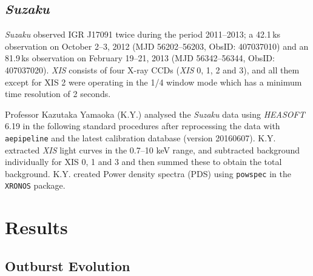 \subsection{\textit{Suzaku}}

\par \textit{Suzaku} observed IGR J17091 twice during the period 2011--2013; a 42.1\,ks observation on October 2--3, 2012 (MJD 56202--56203, ObsID: 407037010) and an 81.9\,ks observation on February 19--21, 2013 (MJD 56342--56344, ObsID: 407037020). \textit{XIS} consists of four X-ray CCDs (\textit{XIS} 0, 1, 2 and 3), and all them except for XIS 2 were operating in the 1/4 window mode which has a minimum time resolution of 2 seconds.
\par Professor Kazutaka Yamaoka (\textsf{K.Y.}) analysed the \textit{Suzaku} data using {\it HEASOFT} 6.19 in the following standard procedures after reprocessing the data with \texttt{aepipeline} and the latest calibration database (version 20160607).  \textsf{K.Y.} extracted \textit{XIS} light curves in the 0.7--10 keV range, and subtracted background individually for XIS 0, 1 and 3 and then summed these to obtain the total background.  \textsf{K.Y.} created Power density spectra (PDS) using {\tt powspec} in the {\tt XRONOS} package.

\section{Results}
\label{sec:results}

\subsection{Outburst Evolution}

\label{sec:igrobevo}

